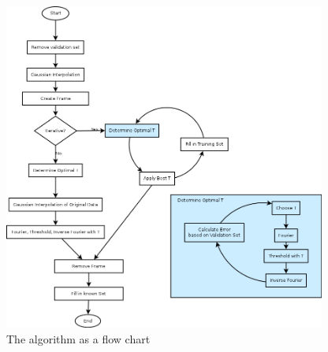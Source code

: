 \documentclass[10pt,conference,compsocconf]{IEEEtran}
\begin{document}




\begin{figure}[b]
  \centering
  \includegraphics[width= 400px]{images/flowchart}
  \caption{The algorithm as a flow chart}
  \label{fig:flowchart}
\end{figure}
\end{document}

